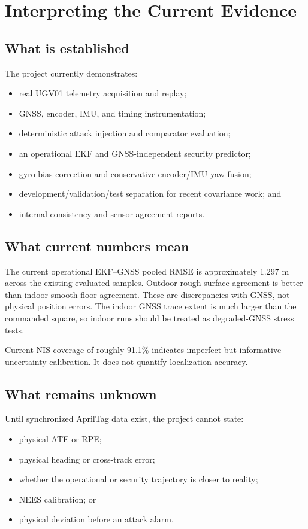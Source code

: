 \documentclass[11pt,oneside]{book}
\begin{document}
\chapter{Interpreting the Current Evidence}

\section{What is established}

The project currently demonstrates:
\begin{itemize}
  \item real UGV01 telemetry acquisition and replay;
  \item GNSS, encoder, IMU, and timing instrumentation;
  \item deterministic attack injection and comparator evaluation;
  \item an operational EKF and GNSS-independent security predictor;
  \item gyro-bias correction and conservative encoder/IMU yaw fusion;
  \item development/validation/test separation for recent covariance work; and
  \item internal consistency and sensor-agreement reports.
\end{itemize}

\section{What current numbers mean}

The current operational EKF--GNSS pooled RMSE is approximately 1.297 m across
the existing evaluated samples. Outdoor rough-surface agreement is better than
indoor smooth-floor agreement. These are discrepancies with GNSS, not physical
position errors. The indoor GNSS trace extent is much larger than the
commanded square, so indoor runs should be treated as degraded-GNSS stress
tests.

Current NIS coverage of roughly 91.1\% indicates imperfect but informative
uncertainty calibration. It does not quantify localization accuracy.

\section{What remains unknown}

Until synchronized AprilTag data exist, the project cannot state:
\begin{itemize}
  \item physical ATE or RPE;
  \item physical heading or cross-track error;
  \item whether the operational or security trajectory is closer to reality;
  \item NEES calibration; or
  \item physical deviation before an attack alarm.
\end{itemize}
\end{document}
